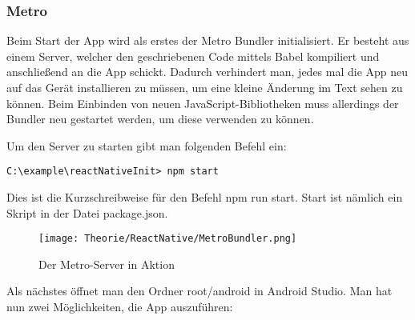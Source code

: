 \subsubsection{Metro}
\label{metrobundler}
Beim Start der App wird als erstes der Metro Bundler initialisiert. Er besteht aus einem Server,
welcher den geschriebenen Code mittels Babel kompiliert und anschließend an die App schickt. Dadurch
verhindert man, jedes mal die App neu auf das Gerät installieren zu müssen, um eine kleine Änderung
im Text sehen zu können. Beim Einbinden von neuen JavaScript-Bibliotheken muss allerdings der
Bundler neu gestartet werden, um diese verwenden zu können.

Um den Server zu starten gibt man folgenden Befehl ein:

\begin{lstlisting}
C:\example\reactNativeInit> npm start
\end{lstlisting}

Dies ist die Kurzschreibweise für den Befehl npm run start. Start ist nämlich ein Skript in der
Datei package.json.

\begin{figure}[H]
  \begin{center}
    \texttt{[image: Theorie/ReactNative/MetroBundler.png]}
    \caption{Der Metro-Server in Aktion}
  \end{center}
\end{figure}

Als nächstes öffnet man den Ordner root/android in Android Studio. Man hat nun zwei Möglichkeiten,
die App auszuführen:

